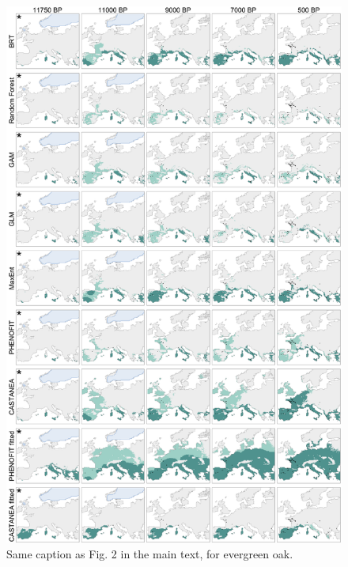 \begin{figure}
\hspace*{-.3in}
\centering
\includegraphics{chapter2/figs/supp/figS6_quercusevergreen_simulations-1.pdf}
\caption{Same caption as Fig. 2 in the main text, for evergreen oak.}
\label{fig:S6}
\end{figure}

